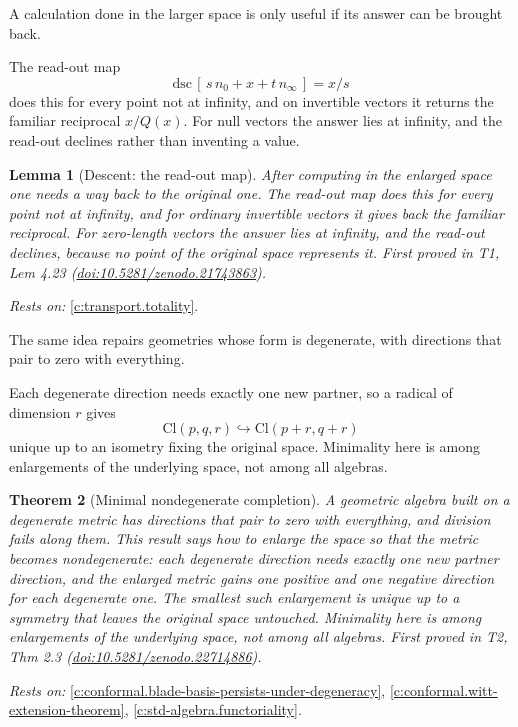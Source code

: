 \documentclass[11pt]{article}
\newtheorem{theorem}{Theorem}[section]
\newtheorem{lemma}[theorem]{Lemma}
\theoremstyle{definition}
\theoremstyle{plain}
\providecommand{\Cl}{}\renewcommand{\Cl}{\mathrm{Cl}}
\providecommand{\dsc}{}\renewcommand{\dsc}{\mathrm{dsc}}
\providecommand{\nInf}{}\renewcommand{\nInf}{n_\infty}
\providecommand{\nO}{}\renewcommand{\nO}{n_0}
\begin{document}
A calculation done in the larger space is only useful if its answer can be brought back.

The read-out map \[ \dsc\,[\, s\,\nO + x + t\,\nInf \,] = x/s \] does this for every point not at infinity, and on invertible vectors it returns the familiar reciprocal $x/Q(x)$. For null vectors the answer lies at infinity, and the read-out declines rather than inventing a value.

\begin{lemma}[Descent: the read-out map]\label{c:transport.descent-read-out-map}
After computing in the enlarged space one needs a way back to the original one. The read-out map does this for every point not at infinity, and for ordinary invertible vectors it gives back the familiar reciprocal. For zero-length vectors the answer lies at infinity, and the read-out declines, because no point of the original space represents it.
\emph{First proved in} T1, Lem 4.23 (\href{https://doi.org/10.5281/zenodo.21743863}{doi:10.5281/zenodo.21743863}).
\end{lemma}
\noindent\emph{Rests on:} \ref{c:transport.totality}.

The same idea repairs geometries whose form is degenerate, with directions that pair to zero with everything.

Each degenerate direction needs exactly one new partner, so a radical of dimension $r$ gives \[ \Cl(p,q,r) \hookrightarrow \Cl(p{+}r, q{+}r) \] unique up to an isometry fixing the original space. Minimality here is among enlargements of the underlying space, not among all algebras.

\begin{theorem}[Minimal nondegenerate completion]\label{c:conformal.minimal-nondegenerate-completion}
A geometric algebra built on a degenerate metric has directions that pair to zero with everything, and division fails along them. This result says how to enlarge the space so that the metric becomes nondegenerate: each degenerate direction needs exactly one new partner direction, and the enlarged metric gains one positive and one negative direction for each degenerate one. The smallest such enlargement is unique up to a symmetry that leaves the original space untouched. Minimality here is among enlargements of the underlying space, not among all algebras.
\emph{First proved in} T2, Thm 2.3 (\href{https://doi.org/10.5281/zenodo.22714886}{doi:10.5281/zenodo.22714886}).
\end{theorem}
\noindent\emph{Rests on:} \ref{c:conformal.blade-basis-persists-under-degeneracy}, \ref{c:conformal.witt-extension-theorem}, \ref{c:std-algebra.functoriality}.
\end{document}
